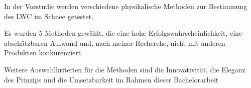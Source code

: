 
In der Vorstudie werden verschiedene physikalische Methoden zur Bestimmung des LWC im Schnee getestet.

Es wurden 5 Methoden gewählt, die eine hohe Erfolgswahrscheinlichkeit, eine abschätzbaren Aufwand und, nach meiner Recherche, nicht mit anderen Produkten konkurenziert.

Weitere Auswahlkriterien für die Methoden sind die Innovativität, die Eleganz des Prinzips und die Umsetzbarkeit im Rahmen dieser Bachelorarbeit
